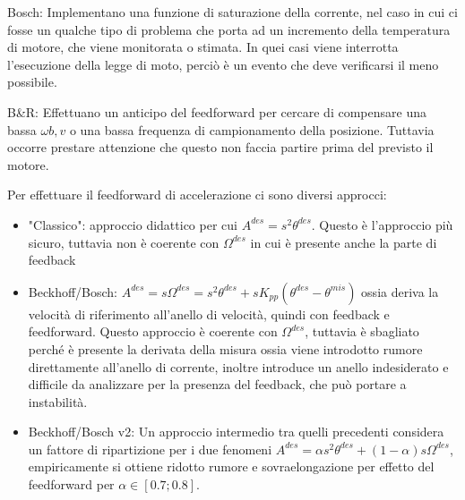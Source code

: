 Bosch: Implementano una funzione di saturazione della corrente, nel caso in cui ci fosse un qualche tipo di problema che porta ad un incremento della temperatura di motore, che viene monitorata o stimata. In quei casi viene interrotta l'esecuzione della legge di moto, perciò è un evento che deve verificarsi il meno possibile.

B\&R: Effettuano un anticipo del feedforward per cercare di compensare una bassa \(\omega{b,v}\) o una bassa frequenza di campionamento della posizione. Tuttavia occorre prestare attenzione che questo non faccia partire prima del previsto il motore.

Per effettuare il feedforward di accelerazione ci sono diversi approcci:
\begin{itemize}
    \item "Classico": approccio didattico per cui \(A^{des}=s^2 \theta^{des}\). Questo è l'approccio più sicuro, tuttavia non è coerente con \(\Omega^{des}\) in cui è presente anche la parte di feedback
    \item Beckhoff/Bosch: \(A^{des}=s\Omega^{des}=s^2 \theta^{des}+sK_{pp}(\theta^{des}-\theta^{mis})\) ossia deriva la velocità di riferimento all'anello di velocità, quindi con feedback e feedforward. Questo approccio è coerente con \(\Omega^{des}\), tuttavia è sbagliato perché è presente la derivata della misura ossia viene introdotto rumore direttamente all'anello di corrente, inoltre introduce un anello indesiderato e difficile da analizzare per la presenza del feedback, che può portare a instabilità.
    \item Beckhoff/Bosch v2: Un approccio intermedio tra quelli precedenti considera un fattore di ripartizione per i due fenomeni \(A^{des}=\alpha s^2 \theta^{des}+(1-\alpha)s\Omega^{des}\), empiricamente si ottiene ridotto rumore e sovraelongazione per effetto del feedforward per \(\alpha \in [0.7; 0.8]\).
\end{itemize}